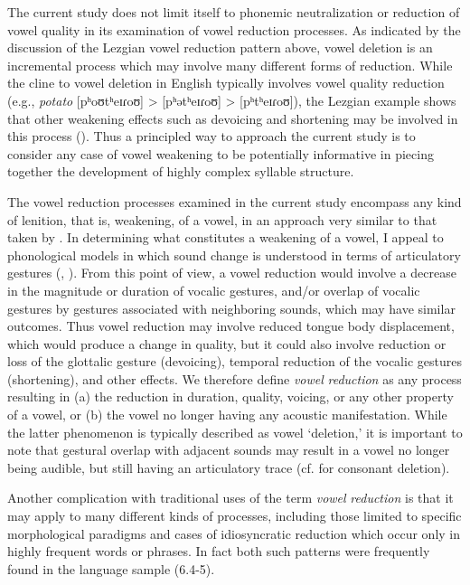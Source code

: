  The current study does not limit itself to phonemic neutralization or reduction of vowel quality in its examination of vowel reduction processes. As indicated by the discussion of the Lezgian vowel reduction pattern above, vowel deletion is an incremental process which may involve many different forms of reduction. While the cline to vowel deletion in English typically involves vowel quality reduction (e.g., \textit{potato} [pʰoʊtʰeɪɾoʊ] > [pʰətʰeɪɾoʊ] > [pʰtʰeɪɾoʊ]), the Lezgian example shows that other weakening effects such as devoicing and shortening may be involved in this process (\citealt{ChitoranBabaliyeva2007}). Thus a principled way to approach the current study is to consider any case of vowel weakening to be potentially informative in piecing together the development of highly complex syllable structure.

  The vowel reduction processes examined in the current study encompass any kind of lenition, that is, weakening, of a vowel, in an approach very similar to that taken by \citet{KapatsinskiEtAl2019}. In determining what constitutes a weakening of a vowel, I appeal to phonological models in which sound change is understood in terms of articulatory gestures (\citealt{BrowmanGoldstein1992b}, \citealt{MowreyPagliuca1995}). From this point of view, a vowel reduction would involve a decrease in the magnitude or duration of vocalic gestures, and/or overlap of vocalic gestures by gestures associated with neighboring sounds, which may have similar outcomes. Thus vowel reduction may involve reduced tongue body displacement, which would produce a change in quality, but it could also involve reduction or loss of the glottalic gesture (devoicing), temporal reduction of the vocalic gestures (shortening), and other effects. We therefore define \textit{vowel} \textit{reduction} as any process resulting in (a) the reduction in duration, quality, voicing, or any other property of a vowel, or (b) the vowel no longer having any acoustic manifestation. While the latter phenomenon is typically described as vowel ‘deletion,’ it is important to note that gestural overlap with adjacent sounds may result in a vowel no longer being audible, but still having an articulatory trace (cf. \citealt{BrowmanGoldstein1990} for consonant deletion).

  Another complication with traditional uses of the term \textit{vowel} \textit{reduction} is that it may apply to many different kinds of processes, including those limited to specific morphological paradigms and cases of idiosyncratic reduction which occur only in highly frequent words or phrases. In fact both such patterns were frequently found in the language sample (6.4-5).

